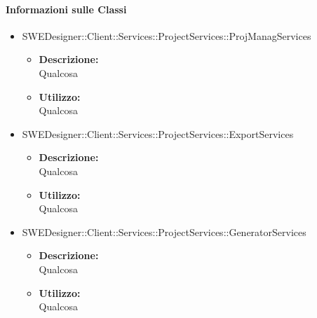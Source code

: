 		\paragraph{Informazioni sulle Classi}
		\begin{itemize}
			\item SWEDesigner::Client::Services::ProjectServices::ProjManagServices
			\begin{itemize}
				\item \textbf{Descrizione: }\\
				Qualcosa
				\item \textbf{Utilizzo: }\\
				Qualcosa
			\end{itemize}
			\item SWEDesigner::Client::Services::ProjectServices::ExportServices
			\begin{itemize}
				\item \textbf{Descrizione: }\\
				Qualcosa
				\item \textbf{Utilizzo: }\\
				Qualcosa
			\end{itemize}
			\item SWEDesigner::Client::Services::ProjectServices::GeneratorServices
			\begin{itemize}
				\item \textbf{Descrizione: }\\
				Qualcosa
				\item \textbf{Utilizzo: }\\
				Qualcosa
			\end{itemize}
		\end{itemize}
